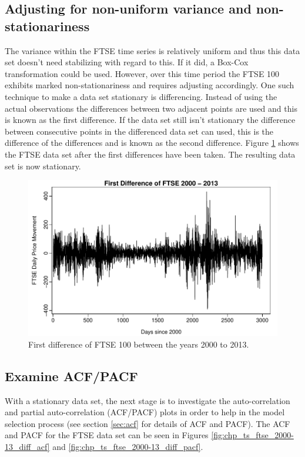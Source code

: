 \subsection{Adjusting for non-uniform variance and non-stationariness}
The variance within the FTSE time series is relatively uniform and thus this data set doesn't need stabilizing with regard to this. If it did, a Box-Cox transformation could be used. However, over this time period the FTSE 100 exhibits marked non-stationariness and requires adjusting accordingly. One such technique to make a data set stationary is differencing. Instead of using the actual observations the differences between two adjacent points are used and this is known as the first difference. If the data set still isn't stationary the difference between consecutive points in the differenced data set can used, this is the difference of the differences and is known as the second difference. Figure \ref{fig:chp_ts_ftse_2000_13_diff} shows the FTSE data set after the first differences have been taken.  The resulting data set is now stationary.

\begin{figure}[tbh]
\centering
\includegraphics{Figures/chp_ts_ftse_2000-13_diff}
\caption[First difference of FTSE 100 between the years 2000 to 2013]{First difference of FTSE 100 between the years 2000 to 2013.}
\label{fig:chp_ts_ftse_2000_13_diff}
\end{figure}

\subsection{Examine ACF/PACF}
With a stationary data set, the next stage is to investigate the auto-correlation and partial auto-correlation (ACF/PACF) plots in order to help in the model selection process (see section \ref{sec:acf} for details of ACF and PACF). The ACF and PACF for the FTSE data set can be seen in Figures \ref{fig:chp_ts_ftse_2000-13_diff_acf} and \ref{fig:chp_ts_ftse_2000-13_diff_pacf}. 

